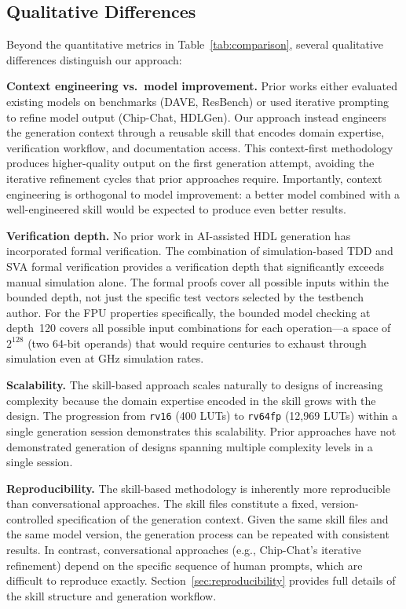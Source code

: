 \documentclass[journal]{IEEEtran}
\begin{document}
\subsection{Qualitative Differences}

Beyond the quantitative metrics in Table~\ref{tab:comparison}, several
qualitative differences distinguish our approach:

\textbf{Context engineering vs.\ model improvement.}  Prior works either
evaluated existing models on benchmarks
(DAVE, ResBench) or used iterative prompting to refine model
output (Chip-Chat, HDLGen).  Our approach instead engineers the
generation context through a reusable skill that encodes domain
expertise, verification workflow, and documentation access.  This
context-first methodology produces higher-quality output on the first
generation attempt, avoiding the iterative refinement cycles that prior
approaches require.  Importantly, context engineering is orthogonal to
model improvement: a better model combined with a well-engineered skill
would be expected to produce even better results.

\textbf{Verification depth.}  No prior work in AI-assisted HDL
generation has incorporated formal verification.  The combination of
simulation-based TDD and SVA formal verification provides a
verification depth that significantly exceeds manual simulation alone.
The formal proofs cover all possible inputs within the bounded depth, not
just the specific test vectors selected by the testbench author.  For
the FPU properties specifically, the bounded model checking at depth~120
covers all possible input combinations for each operation---a space of
$2^{128}$ (two 64-bit operands) that would require centuries to exhaust
through simulation even at GHz simulation rates.

\textbf{Scalability.}  The skill-based approach scales naturally to
designs of increasing complexity because the domain expertise encoded in
the skill grows with the design.  The progression from \texttt{rv16}
(400 LUTs) to \texttt{rv64fp} (12,969 LUTs) within a single generation
session demonstrates this scalability.  Prior approaches have not
demonstrated generation of designs spanning multiple complexity levels in
a single session.

\textbf{Reproducibility.}  The skill-based methodology is inherently
more reproducible than conversational approaches.  The skill files
constitute a fixed, version-controlled specification of the generation
context.  Given the same skill files and the same model version, the
generation process can be repeated with consistent results.  In
contrast, conversational approaches (e.g., Chip-Chat's iterative
refinement) depend on the specific sequence of human prompts, which are
difficult to reproduce exactly.  Section~\ref{sec:reproducibility}
provides full details of the skill structure and generation workflow.
\end{document}
